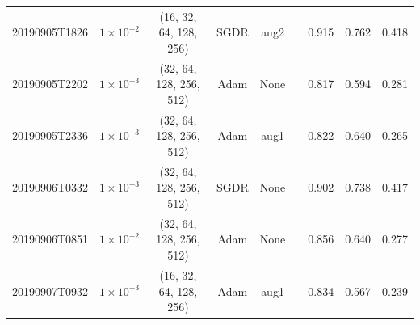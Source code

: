 \begin{table}[!ht]
\begin{adjustbox}{width=\columnwidth, center}
\begin{tabular}{ccccccccc}
			20190905T1826                        & $1\times10^{-2}$                                   & (16, 32, 64, 128, 256)                      & SGDR                                & aug2                                                                                      & \cmark                                                                                     & 0.915          & 0.762          & 0.418          \\
			20190905T2202                        & $1\times10^{-3}$                                  & (32, 64, 128, 256, 512)                     & Adam                                & None                                                                                      & \cmark                                                                                     & 0.817          & 0.594          & 0.281          \\
			20190905T2336                        & $1\times10^{-3}$                                  & (32, 64, 128, 256, 512)                     & Adam                                & aug1                                                                                      & \cmark                                                                                     & 0.822          & 0.640          & 0.265          \\
			20190906T0332                        & $1\times10^{-3}$                                  & (32, 64, 128, 256, 512)                     & SGDR                                & None                                                                                      & \cmark                                                                                     & 0.902          & 0.738          & 0.417          \\
			20190906T0851                        & $1\times10^{-2}$                                   & (32, 64, 128, 256, 512)                     & Adam                                & None                                                                                      & \cmark                                                                                     & 0.856          & 0.640          & 0.277          \\
			20190907T0932                        & $1\times10^{-3}$                                  & (16, 32, 64, 128, 256)                      & Adam                                & aug1                                                                                      & \cmark                                                                                     & 0.834          & 0.567          & 0.239          \\

\end{tabular}
\end{adjustbox}
\end{table}
